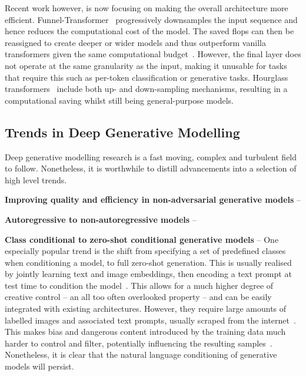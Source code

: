 Recent work however, is now focusing on making the overall architecture more
efficient. Funnel-Transformer~\cite{dai2020funneltransformer} progressively
downsamples the input sequence and hence reduces the computational cost of the
model. The saved \glspl{flop} can then be reassigned to create deeper or wider models
and thus outperform vanilla transformers given the same computational
budget~\cite{dai2020funneltransformer}. However, the final layer does not
operate at the same granularity as the input, making it unusable for tasks that
require this such as per-token classification or generative tasks. Hourglass
transformers~\cite{nawrot2021hierarchical} include both up- and down-sampling
mechanisms, resulting in a computational saving whilst still being
general-purpose models.

\subsection{Trends in Deep Generative Modelling}
\label{subsec:trends}

Deep generative modelling research is a fast moving, complex and turbulent field
to follow. Nonetheless, it is worthwhile to distill advancements into a
selection of high level trends.

\textbf{Improving quality and efficiency in non-adversarial generative models} -- 

\textbf{Autoregressive to non-autoregressive models} -- 

\textbf{Class conditional to zero-shot conditional generative models} -- 
One especially popular trend is the shift from specifying a set of predefined
classes when conditioning a model, to full zero-shot generation. This is usually
realised by jointly learning text and image embeddings, then encoding a text
prompt at test time to condition the
model~\cite{ramesh2021dalle,ramesh2022dalle2,rombach2021highresolution,lee2022rqvae}.
This allows for a much higher degree of creative control -- an all too often
overlooked property -- and can be easily integrated with existing architectures.
However, they require large amounts of labelled images and associated text
prompts, usually scraped from the
internet~\cite{rombach2021highresolution,ramesh2021dalle,ramesh2022dalle2}. This
makes bias and dangerous content introduced by the training data much harder to
control and filter, potentially influencing the resulting
samples~\cite{mishkin2022risks}. Nonetheless, it is clear that the natural
language conditioning of generative models will persist.

